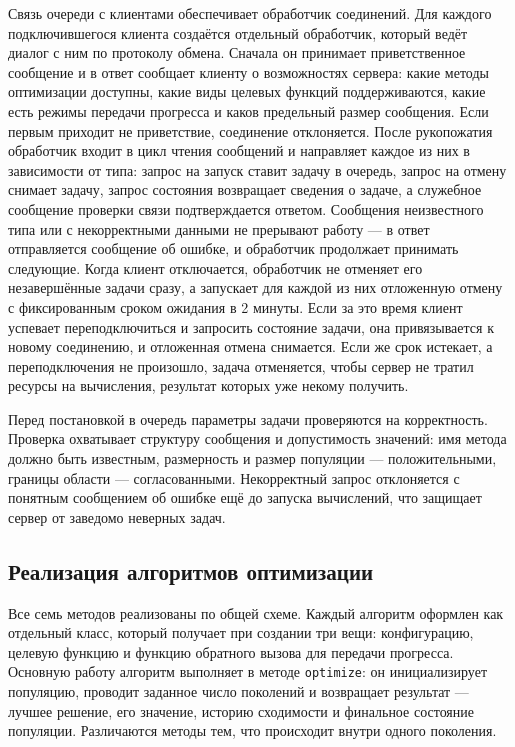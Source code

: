 \documentclass[14pt, a4paper]{extarticle}
\begin{document}
Связь очереди с клиентами обеспечивает обработчик соединений. Для каждого
подключившегося клиента создаётся отдельный обработчик, который ведёт диалог с ним
по протоколу обмена. Сначала он принимает приветственное сообщение и в ответ
сообщает клиенту о возможностях сервера: какие методы оптимизации доступны, какие
виды целевых функций поддерживаются, какие есть режимы передачи прогресса и каков
предельный размер сообщения. Если первым приходит не приветствие, соединение
отклоняется. После рукопожатия обработчик входит в цикл чтения сообщений и
направляет каждое из них в зависимости от типа: запрос на запуск ставит задачу в
очередь, запрос на отмену снимает задачу, запрос состояния возвращает сведения о
задаче, а служебное сообщение проверки связи подтверждается ответом. Сообщения
неизвестного типа или с некорректными данными не прерывают работу --- в ответ
отправляется сообщение об ошибке, и обработчик продолжает принимать следующие.
Когда клиент отключается, обработчик не отменяет его незавершённые задачи сразу, а
запускает для каждой из них отложенную отмену с фиксированным сроком ожидания в 2 минуты. 
Если за это время клиент успевает переподключиться и запросить состояние задачи, она
привязывается к новому соединению, и отложенная отмена снимается. Если же срок
истекает, а переподключения не произошло, задача отменяется, чтобы сервер не тратил
ресурсы на вычисления, результат которых уже некому получить.

Перед постановкой в очередь параметры задачи проверяются на корректность. Проверка
охватывает структуру сообщения и допустимость значений: имя метода должно быть
известным, размерность и размер популяции --- положительными, границы области ---
согласованными. Некорректный запрос отклоняется с понятным сообщением об ошибке
ещё до запуска вычислений, что защищает сервер от заведомо неверных задач.

\subsection{Реализация алгоритмов оптимизации}
\label{subsec:algo-impl}

Все семь методов реализованы по общей схеме. Каждый алгоритм оформлен как
отдельный класс, который получает при создании три вещи: конфигурацию, целевую
функцию и функцию обратного вызова для передачи прогресса. Основную работу
алгоритм выполняет в методе \texttt{optimize}: он инициализирует популяцию,
проводит заданное число поколений и возвращает результат --- лучшее решение, его
значение, историю сходимости и финальное состояние популяции. Различаются методы
тем, что происходит внутри одного поколения.
\end{document}
